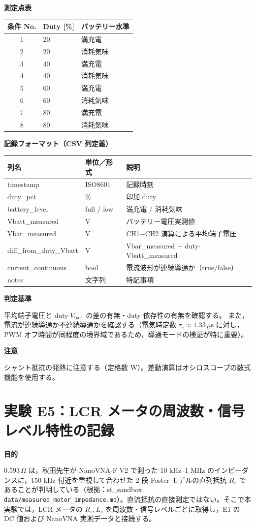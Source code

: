 \documentclass[a4paper,11pt]{ltjsarticle}
\newcommand{\expfield}[1]{\medskip\noindent\textbf{#1}\par\nobreak\smallskip\noindent}
\begin{document}
\expfield{測定点表}
\begin{center}
\small
\begin{tabular}{@{}cll@{}}
\toprule
条件 No. & Duty [\%] & バッテリー水準 \\
\midrule
1 & 20 & 満充電 \\
2 & 20 & 消耗気味 \\
3 & 40 & 満充電 \\
4 & 40 & 消耗気味 \\
5 & 60 & 満充電 \\
6 & 60 & 消耗気味 \\
7 & 80 & 満充電 \\
8 & 80 & 消耗気味 \\
\bottomrule
\end{tabular}
\end{center}

\expfield{記録フォーマット（CSV 列定義）}
\begin{tabular}{@{}p{44mm}p{22mm}p{87mm}@{}}
\toprule
列名 & 単位／形式 & 説明 \\
\midrule
timestamp & ISO8601 & 記録時刻 \\
duty\_pct & \% & 印加 duty \\
battery\_level & full / low & 満充電 / 消耗気味 \\
Vbatt\_measured & V & バッテリー電圧実測値 \\
Vbar\_measured & V & CH1$-$CH2 演算による平均端子電圧 \\
diff\_from\_duty\_Vbatt & V & Vbar\_measured $-$ duty$\cdot$Vbatt\_measured \\
current\_continuous & bool & 電流波形が連続導通か（true/false） \\
notes & 文字列 & 特記事項 \\
\bottomrule
\end{tabular}

\expfield{判定基準}
平均端子電圧と duty$\cdot V_\mathrm{batt}$ の差の有無・duty 依存性の有無を確認する。
また，電流が連続導通か不連続導通かを確認する（電気時定数 $\tau_e \approx 1.33\,\mu\mathrm{s}$ に対し，
PWM オフ時間が同程度の境界域であるため，導通モードの検証が特に重要）。

\expfield{注意}
シャント抵抗の発熱に注意する（定格数 W）。差動演算はオシロスコープの数式機能を使用する。

\section{実験 E5：LCR メータの周波数・信号レベル特性の記録}
\expfield{目的}
$0.593\,\Omega$ は，秋田先生が NanoVNA-F V2 で測った 10 kHz--1 MHz のインピーダンスに，150 kHz 付近を重視して合わせた 2 段 Foster モデルの直列抵抗 $R_s$ であることが判明している（根拠：sf\_sandbox \texttt{data/measured\_motor\_impedance.md}）。直流抵抗の直接測定ではない。そこで本実験では，LCR メータの $R_s, L_s$ を周波数・信号レベルごとに取得し，E1 の DC 値および NanoVNA 実測データと接続する。
\end{document}
